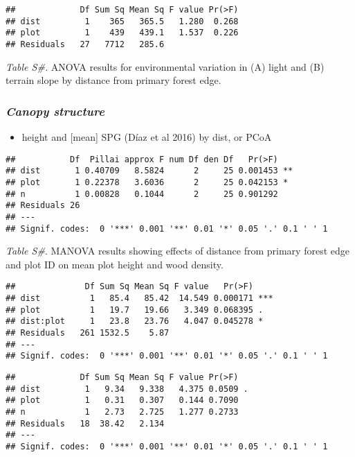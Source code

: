 \documentclass[]{article}
\providecommand{\tightlist}{%
  \setlength{\itemsep}{0pt}\setlength{\parskip}{0pt}}
\begin{document}
\begin{verbatim}
##             Df Sum Sq Mean Sq F value Pr(>F)
## dist         1    365   365.5   1.280  0.268
## plot         1    439   439.1   1.537  0.226
## Residuals   27   7712   285.6
\end{verbatim}

\emph{Table S\#.} ANOVA results for environmental variation in (A) light
and (B) terrain slope by distance from primary forest edge.

\hypertarget{canopy-structure}{%
\subsubsection{\texorpdfstring{\emph{Canopy
structure}}{Canopy structure}}\label{canopy-structure}}

\begin{itemize}
\tightlist
\item
  height and {[}mean{]} SPG (Díaz et al 2016) by dist, or PCoA
\end{itemize}

\begin{verbatim}
##           Df  Pillai approx F num Df den Df   Pr(>F)   
## dist       1 0.40709   8.5824      2     25 0.001453 **
## plot       1 0.22378   3.6036      2     25 0.042153 * 
## n          1 0.00828   0.1044      2     25 0.901292   
## Residuals 26                                           
## ---
## Signif. codes:  0 '***' 0.001 '**' 0.01 '*' 0.05 '.' 0.1 ' ' 1
\end{verbatim}

\emph{Table S\#}. MANOVA results showing effects of distance from
primary forest edge and plot ID on mean plot height and wood density.

\begin{verbatim}
##              Df Sum Sq Mean Sq F value   Pr(>F)    
## dist          1   85.4   85.42  14.549 0.000171 ***
## plot          1   19.7   19.66   3.349 0.068395 .  
## dist:plot     1   23.8   23.76   4.047 0.045278 *  
## Residuals   261 1532.5    5.87                     
## ---
## Signif. codes:  0 '***' 0.001 '**' 0.01 '*' 0.05 '.' 0.1 ' ' 1
\end{verbatim}

\begin{verbatim}
##             Df Sum Sq Mean Sq F value Pr(>F)  
## dist         1   9.34   9.338   4.375 0.0509 .
## plot         1   0.31   0.307   0.144 0.7090  
## n            1   2.73   2.725   1.277 0.2733  
## Residuals   18  38.42   2.134                 
## ---
## Signif. codes:  0 '***' 0.001 '**' 0.01 '*' 0.05 '.' 0.1 ' ' 1
\end{verbatim}
\end{document}
